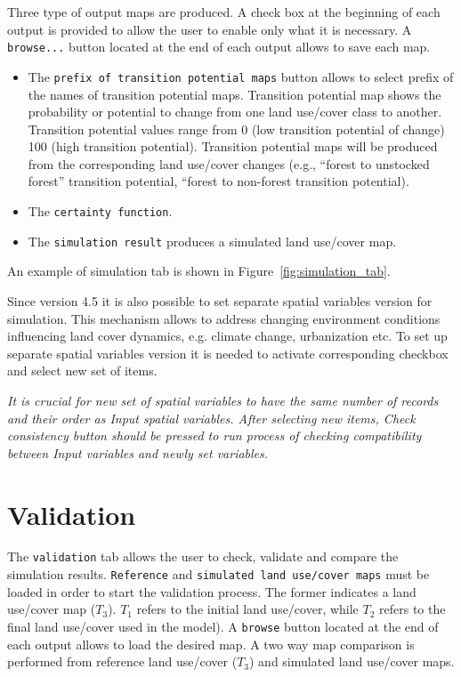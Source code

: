 \documentclass{report}
\begin{document}
Three type of output maps are produced. A check box at the beginning of each output is provided to
allow the user to enable only what it is necessary. A \verb+browse...+ button located at the end of each
output allows to save each map.

\begin{itemize}
  \item The \verb+prefix of transition potential maps+ button allows to select prefix of the names of
    transition potential maps. Transition potential map shows the probability or potential to
    change from one land use/cover class to another. Transition potential values range from 0
    (low transition potential of change) 100 (high transition potential). Transition potential maps
    will be produced from the corresponding land use/cover changes (e.g., “forest to unstocked
    forest” transition potential, “forest to non-forest transition potential).
  \item The \verb+certainty function+.
  \item The \verb+simulation result+ produces a simulated land use/cover map.
\end{itemize}

An example of simulation tab is shown in Figure~\ref{fig:simulation_tab}.

Since version 4.5 it is also possible to set separate spatial variables version for simulation. This mechanism allows to address changing environment conditions influencing land cover dynamics, e.g. climate change, urbanization etc. To set up separate spatial variables version it is needed to activate corresponding checkbox and select new set of items.

\emph{It is crucial for new set of spatial variables to have the same number of records and their order as Input spatial variables. After selecting new items, Check consistency button should be pressed to run process of checking compatibility between Input variables and newly set variables.}

\section{Validation}

The \verb+validation+ tab allows the user to check, validate and compare the simulation results. 
\verb+Reference+ and \verb+simulated land use/cover maps+ must be loaded in order 
to start the validation process. The
former indicates a land use/cover map ($T_3$). $T_1$ refers to the initial land use/cover, while $T_2$ refers to
the final land use/cover used in the model). A \verb+browse+ button located at the end of each output
allows to load the desired map. A two way map comparison is performed from reference land
use/cover ($T_3$) and simulated land use/cover maps.
\end{document}
